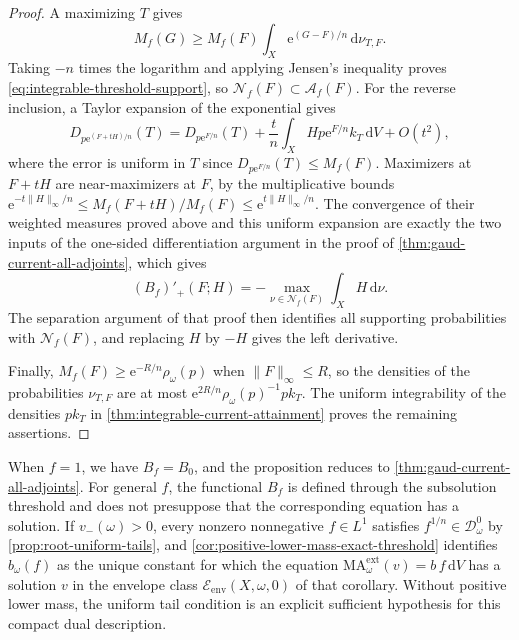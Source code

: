\begin{proof}
A maximizing $T$ gives
\[
 M_f(G)\geq M_f(F)\int_X\mathrm{e}^{(G-F)/n}\,\mathrm{d}\nu_{T,F}.
\]
Taking $-n$ times the logarithm and applying Jensen's inequality proves \eqref{eq:integrable-threshold-support}, so $\mathscr N_f(F)\subset\mathcal A_f(F)$. For the reverse inclusion, a Taylor expansion of the exponential gives
\[
 D_{p \mathrm{e}^{(F+tH)/n}}(T)
 =D_{p \mathrm{e}^{F/n}}(T)+\frac tn\int_X H p \mathrm{e}^{F/n} k_T\,\mathrm{d}V+O(t^2),
\]
where the error is uniform in $T$ since $D_{p \mathrm{e}^{F/n}}(T)\leq M_f(F)$. Maximizers at $F+tH$ are near-maximizers at $F$, by the multiplicative bounds $\mathrm{e}^{-t\|H\|_\infty/n}\leq M_f(F+tH)/M_f(F)\leq\mathrm{e}^{t\|H\|_\infty/n}$. The convergence of their weighted measures proved above and this uniform expansion are exactly the two inputs of the one-sided differentiation argument in the proof of \cref{thm:gaud-current-all-adjoints}, which gives
\[
 (B_f)'_+(F;H)=-\max_{\nu\in\mathscr N_f(F)}\int_XH\,\mathrm{d}\nu.
\]
The separation argument of that proof then identifies all supporting probabilities with $\mathscr N_f(F)$, and replacing $H$ by $-H$ gives the left derivative.

Finally, $M_f(F)\geq \mathrm{e}^{-R/n}\rho_\omega(p)$ when $\|F\|_\infty\leq R$, so the densities of the probabilities $\nu_{T,F}$ are at most $\mathrm{e}^{2R/n}\rho_\omega(p)^{-1}p k_T$. The uniform integrability of the densities $pk_T$ in \cref{thm:integrable-current-attainment} proves the remaining assertions.
\end{proof}

When $f=1$, we have $B_f=B_0$, and the proposition reduces to \cref{thm:gaud-current-all-adjoints}. For general $f$, the functional $B_f$ is defined through the subsolution threshold and does not presuppose that the corresponding equation has a solution. If $v_-(\omega)>0$, every nonzero nonnegative $f\in L^1$ satisfies $f^{1/n}\in\mathcal D_\omega^0$ by \cref{prop:root-uniform-tails}, and \cref{cor:positive-lower-mass-exact-threshold} identifies $b_\omega(f)$ as the unique constant for which the equation $\mathrm{MA}^{\mathrm{ext}}_\omega(v)=b\,f\,\mathrm{d}V$ has a solution $v$ in the envelope class $\mathcal E_{\mathrm{env}}(X,\omega,0)$ of that corollary. Without positive lower mass, the uniform tail condition is an explicit sufficient hypothesis for this compact dual description.


